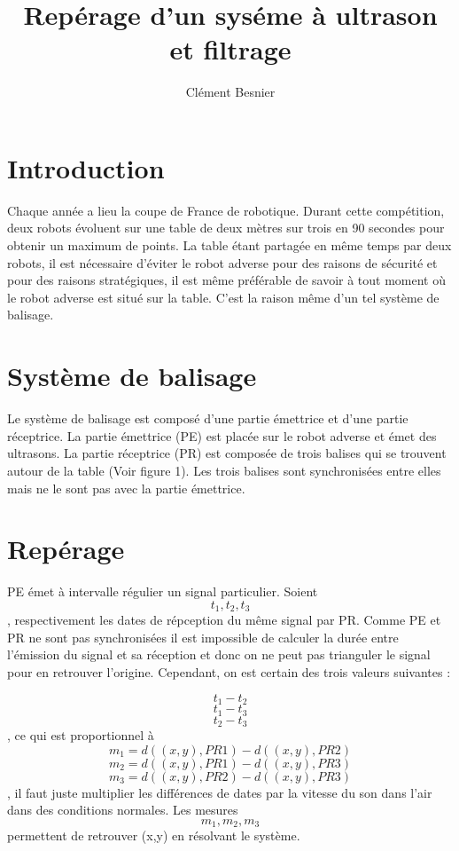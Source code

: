 \documentclass[a4paper, 8pt, landscape]{article}
\title{Rep\'erage d'un sys\'eme \`a ultrason et filtrage}
\author{Cl\'ement Besnier}
\begin{document}
\maketitle
\section{Introduction}

Chaque ann\'ee a lieu la coupe de France de robotique. Durant cette comp\'etition, deux robots \'evoluent sur une table de deux m\`etres sur trois en 90 secondes pour obtenir un maximum de points. La table \'etant partag\'ee en m\^eme temps par deux robots, il est n\'ecessaire d'\'eviter le robot adverse pour des raisons de s\'ecurit\'e et pour des raisons strat\'egiques, il est m\^eme pr\'ef\'erable de savoir \`a tout moment o\`u le robot adverse est situ\'e sur la table. C'est la raison m\^eme d'un tel syst\`eme de balisage.



\section{Syst\`eme de balisage}

Le syst\`eme de balisage est compos\'e d'une partie \'emettrice et d'une partie r\'eceptrice. La partie \'emettrice (PE) est plac\'ee sur le robot adverse et \'emet des ultrasons. La partie r\'eceptrice (PR) est compos\'ee de trois balises qui se trouvent autour de la table (Voir figure 1). Les trois balises sont synchronis\'ees entre elles mais ne le sont pas avec la partie \'emettrice. 

\section{Rep\'erage}

PE \'emet \`a intervalle r\'egulier un signal particulier. Soient \[ t_{1}, t_{2}, t_{3}\], respectivement les dates de r\'epception du m\^eme signal par PR. Comme PE et PR ne sont pas synchronis\'ees il est impossible de calculer la dur\'ee entre l'\'emission du signal et sa r\'eception et donc on ne peut pas trianguler le signal pour en retrouver l'origine. Cependant, on est certain des trois valeurs suivantes : 

\[t_{1} - t_{2}\]
\[t_{1} - t_{3}\]
\[t_{2} - t_{3}\]
, ce qui est proportionnel \`a 
\[m_{1} = d((x,y),PR1)-d((x,y),PR2)\]
\[m_{2} = d((x,y),PR1)-d((x,y),PR3)\]
\[m_{3} = d((x,y),PR2)-d((x,y),PR3)\]
, il faut juste multiplier les diff\'erences de dates par la vitesse du son dans l'air dans des conditions normales. Les mesures \[m_{1}, m_{2},  m_{3} \] permettent de retrouver (x,y) en r\'esolvant le syst\`eme.
\end{document}
